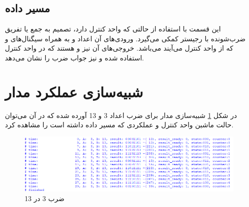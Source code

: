 \documentclass[12pt,onecolumn,a4paper,fleqn]{article}
\begin{document}
	\subsection{مسیر داده}
	این قسمت با استفاده از حالتی که واحد کنترل دارد، تصمیم به جمع یا تفریق ضرب‌شونده با رجیستر کمکی  می‌گیرد. ورودی‌های آن اعداد
	و
	به همراه سیگنال‌های 
	و
	که از واحد کنترل می‌آیند می‌باشد. خروجی‌های آن نیز 
	و
	هستند که  در واحد کنترل استفاده شده و  نیز جواب ضرب را نشان می‌دهد.
	\pagebreak
	\section{شبیه‌سازی عملکرد مدار}
	در شکل \ref{fig:simulation} شبیه‌سازی مدار برای ضرب اعداد 3 و 13 آورده شده که در آن می‌توان حالت ماشبن واحد کنترل و عملکردی که مسیر داده داشته است را مشاهده کرد.
	\begin{figure}[H]
		\centering
		\includegraphics[scale=0.8]{source/simulation.png}
		\caption{ضرب 3 در 13}
		\label{fig:simulation}
	\end{figure}
\end{document}
